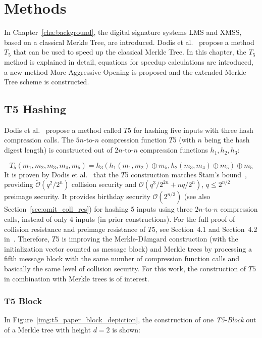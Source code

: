 \chapter{Methods}
\label{cha:methods}
In Chapter~\ref{cha:background}, the digital signature systems LMS and XMSS, based on a classical Merkle Tree, are introduced. Dodis et al.~\cite{T5_paper} propose a method $T_5$ that can be used to speed up the classical Merkle Tree. In this chapter, the $T_5$ method is explained in detail, equations for speedup calculations are introduced, a new method More Aggressive Opening is proposed and the extended Merkle Tree scheme \textit{\extree} is constructed.

\section{T5 Hashing}
Dodis et al.~\cite{T5_paper} propose a method called $T5$ for hashing five inputs with three hash compression calls. The $5n$-to-$n$ compression function $T5$ (with $n$ being the hash digest length) is constructed out of $2n$-to-$n$ compression functions $h_1, h_2, h_3$:

\begin{equation}
\label{eq:t5_basic}
T_5(m_1, m_2, m_3, m_4, m_5) = h_3(h_1(m_1,m_2) \oplus m_5, h_2(m_3,m_4) \oplus m_5) \oplus m_5
\end{equation}
It is proven by Dodis et al.~\cite{T5_paper} that the $T5$ construction matches Stam’s bound~\cite{stams_bound2008}, providing $\tilde{\mathcal{O}}(q^2/2^n)$ collision security and $\mathcal{O}(q^3/2^{2n}+nq/2^n)$, $q \leq 2^{n/2}$ preimage security. It provides birthday security $\mathcal{O}(2^{n/2})$ (see also Section~\ref{sec:omit_coll_res}) for hashing 5 inputs using three $2n$-to-$n$ compression calls, instead of only 4 inputs (in prior constructions). For the full proof of collision resistance and preimage resistance of $T5$, see Section~4.1 and Section~4.2 in~\cite{T5_paper}. %
Therefore, $T5$ is improving the Merkle-D\aa mgard construction (with the initialization vector counted as message block) and Merkle trees by processing a fifth message block with the same number of compression function calls and basically the same level of collision security. 
For this work, the construction of $T5$ in combination with Merkle trees is of interest.  

\subsection{T5 Block}
\label{sec:t5_block}
In Figure~\ref{img:t5_paper_block_depiction}, the construction of one \textit{T5-Block} out of a Merkle tree with height $d=2$ is shown:

